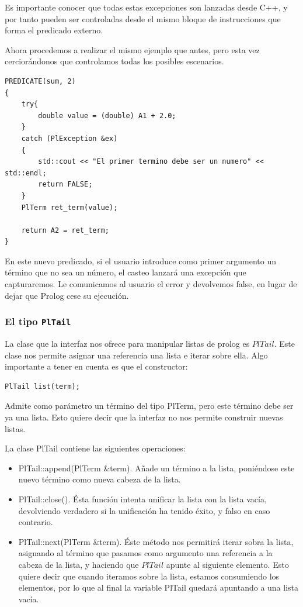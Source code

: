 \documentclass[a4paper,12pt]{article}
\begin{document}
Es importante conocer que todas estas excepciones son lanzadas desde C++, y por tanto pueden ser controladas desde el mismo bloque de instrucciones que forma el predicado externo.

Ahora procedemos a realizar el mismo ejemplo que antes, pero esta vez cerciorándonos que controlamos todas los posibles escenarios.

\begin{lstlisting}[style=C++]
PREDICATE(sum, 2)
{
	try{
		double value = (double) A1 + 2.0;
	}
	catch (PlException &ex)
	{
		std::cout << "El primer termino debe ser un numero" << std::endl;
		return FALSE;
	}
	PlTerm ret_term(value);
	
	return A2 = ret_term;
}
\end{lstlisting}

En este nuevo predicado, si el usuario introduce como primer argumento un término que no sea un número, el casteo lanzará una excepción que capturaremos. Le comunicamos al usuario el error y devolvemos false, en lugar de dejar que Prolog cese su ejecución.

\subsubsection{El tipo \texttt{PlTail}}

La clase que la interfaz nos ofrece para manipular listas de prolog es $PlTail$. Este clase nos permite asignar una referencia una lista e iterar sobre ella. Algo importante a tener en cuenta es que el constructor:

\begin{lstlisting}[style=C++]
PlTail list(term);
\end{lstlisting}

Admite como parámetro un término del tipo PlTerm, pero este término debe ser ya una lista. Esto quiere decir que la interfaz no nos permite construir nuevas listas.

La clase PlTail contiene las siguientes operaciones:

\begin{itemize}
\item PlTail::append(PlTerm \&term). Añade un término a la lista, poniéndose este nuevo término como nueva cabeza de la lista.
\item PlTail::close(). Ésta función intenta unificar la lista con la lista vacía, devolviendo verdadero si la unificación ha tenido éxito, y falso en caso contrario.
\item PlTail::next(PlTerm \&term). Éste método nos permitirá iterar sobra la lista, asignando al término que pasamos como argumento una referencia a la cabeza de la lista, y haciendo que $PlTail$ apunte al siguiente elemento. Esto quiere decir que cuando iteramos sobre la lista, estamos consumiendo los elementos, por lo que al final la variable PlTail quedará apuntando a una lista vacía.
\end{itemize}
\end{document}
